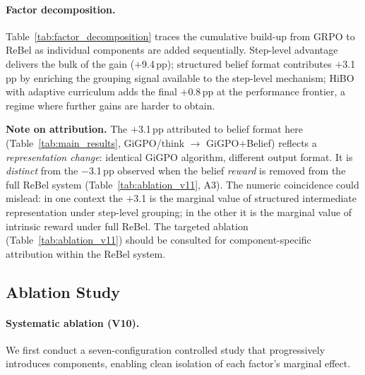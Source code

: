 \paragraph{Factor decomposition.}
Table~\ref{tab:factor_decomposition} traces the cumulative build-up from GRPO to
ReBel as individual components are added sequentially.
Step-level advantage delivers the bulk of the gain ($+$9.4\,pp);
structured belief format contributes $+$3.1\,pp by enriching the grouping signal
available to the step-level mechanism;
HiBO with adaptive curriculum adds the final $+$0.8\,pp at the performance
frontier, a regime where further gains are harder to obtain.

\textbf{Note on attribution.}
The $+$3.1\,pp attributed to belief format here (Table~\ref{tab:main_results},
GiGPO/think $\to$ GiGPO+Belief) reflects a \emph{representation change}:
identical GiGPO algorithm, different output format.
It is \emph{distinct} from the $-$3.1\,pp observed when the belief \emph{reward}
is removed from the full ReBel system (Table~\ref{tab:ablation_v11}, A3).
The numeric coincidence could mislead: in one context the $+$3.1 is the marginal
value of structured intermediate representation under step-level grouping;
in the other it is the marginal value of intrinsic reward under full ReBel.
The targeted ablation (Table~\ref{tab:ablation_v11}) should be consulted for
component-specific attribution within the ReBel system.


\subsection{Ablation Study}
\label{sec:ablation}

\paragraph{Systematic ablation (V10).}
We first conduct a seven-configuration controlled study that progressively introduces
components, enabling clean isolation of each factor's marginal effect.

